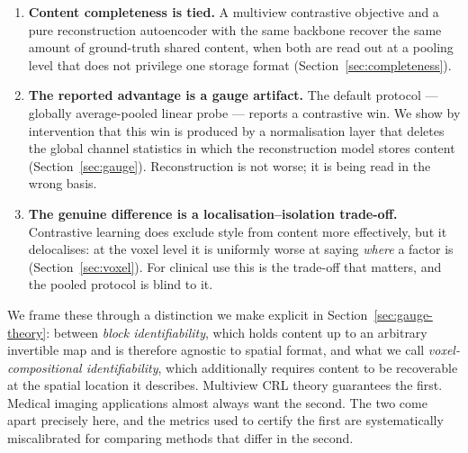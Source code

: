 \documentclass[11pt]{article}
\begin{document}
\begin{enumerate}
\item \textbf{Content completeness is tied.} A multiview contrastive objective and
a pure reconstruction autoencoder with the same backbone recover the same amount
of ground-truth shared content, when both are read out at a pooling level that
does not privilege one storage format (Section~\ref{sec:completeness}).

\item \textbf{The reported advantage is a gauge artifact.} The default protocol ---
globally average-pooled linear probe --- reports a contrastive win. We show by
intervention that this win is produced by a normalisation layer that deletes the
global channel statistics in which the reconstruction model stores content
(Section~\ref{sec:gauge}). Reconstruction is not worse; it is being read in the
wrong basis.

\item \textbf{The genuine difference is a localisation--isolation trade-off.}
Contrastive learning does exclude style from content more effectively, but it
delocalises: at the voxel level it is uniformly worse at saying \emph{where} a
factor is (Section~\ref{sec:voxel}). For clinical use this is the trade-off that
matters, and the pooled protocol is blind to it.
\end{enumerate}

We frame these through a distinction we make explicit in
Section~\ref{sec:gauge-theory}: between \emph{block identifiability}, which
holds content up to an arbitrary invertible map and is therefore agnostic to
spatial format, and what we call \emph{voxel-compositional identifiability},
which additionally requires content to be recoverable at the spatial location it
describes. Multiview CRL theory guarantees the first. Medical imaging
applications almost always want the second. The two come apart precisely here,
and the metrics used to certify the first are systematically miscalibrated for
comparing methods that differ in the second.
\end{document}
